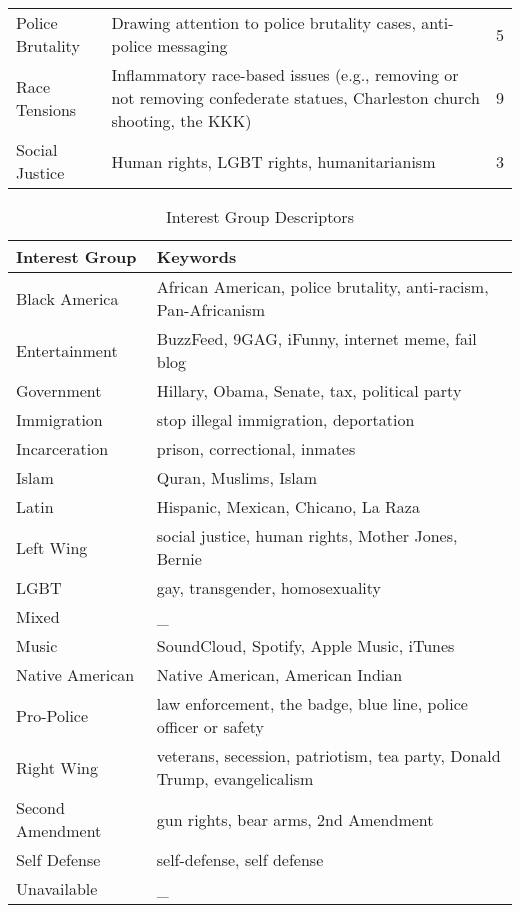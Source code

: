 \documentclass{article}
\begin{document}
\begin{table}[!htb]
\begin{spacing}{1}
\begin{tabular}{Y{3.5cm}Y{10cm}p{1.5cm}}
			\addlinespace[0.1cm]
			Police Brutality  & Drawing attention to police brutality cases, anti-police messaging                                                            & 5         \tabularnewline
			\addlinespace[0.1cm]
			Race Tensions     & Inflammatory race-based issues (e.g., removing or not removing confederate statues, Charleston church shooting, the KKK)~     & 9         \tabularnewline
			\addlinespace[0.1cm]
			Social Justice    & Human rights, LGBT rights, humanitarianism                                                                                    & 3         \tabularnewline
			\bottomrule
		\end{tabular}
	\end{spacing}
\end{table}

\clearpage

\begin{table}[!htb]
	\centering
	\renewcommand\arraystretch{1.1}
	\begin{spacing}{1}
\caption{Interest Group Descriptors}
\begin{tabular}{>{\raggedright}p{3.5cm}>{\raggedright}p{7.5cm}}
\toprule
Interest Group   & Keywords \tabularnewline
        \midrule
Black America    & African American, police brutality, anti-racism, Pan-Africanism           \tabularnewline
Entertainment    & BuzzFeed, 9GAG, iFunny, internet meme, fail blog                          \tabularnewline
Government       & Hillary, Obama, Senate, tax, political party                              \tabularnewline
Immigration      & stop illegal immigration, deportation                                     \tabularnewline
Incarceration    & prison, correctional, inmates                                             \tabularnewline
Islam            & Quran, Muslims, Islam                                                     \tabularnewline
Latin            & Hispanic, Mexican, Chicano, La Raza                                       \tabularnewline
Left Wing        & social justice, human rights, Mother Jones, Bernie                        \tabularnewline
LGBT             & gay, transgender, homosexuality                                           \tabularnewline
Mixed            & \_                                                                        \tabularnewline
Music            & SoundCloud, Spotify, Apple Music, iTunes                                  \tabularnewline
Native American  & Native American, American Indian                                          \tabularnewline
Pro-Police       & law enforcement, the badge, blue line, police officer or safety           \tabularnewline
Right Wing       & veterans, secession, patriotism, tea party, Donald Trump, evangelicalism  \tabularnewline
Second Amendment & gun rights, bear arms, 2nd Amendment                                      \tabularnewline
Self Defense     & self-defense, self defense                                                \tabularnewline
Unavailable      & \_                                                                        \tabularnewline
\bottomrule
\end{tabular}
\end{spacing}
\end{table}
\end{document}
